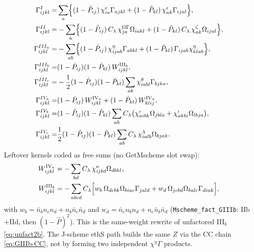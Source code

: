 \documentclass[enabledeprecatedfontcommands]{scrartcl}
\newcommand{\codename}[1]{\texttt{#1}}
\newcommand{\MyRomanNum}[1]{%
  \ifcase#1\or I\or II\or III\or IV\or V\or VI\or VII\or VIII\or IX\or X\else #1\fi}
\begin{document}
\begin{subequations}\label{eq:fact2b}
\begin{align}
\Gamma^{\MyRomanNum{1}}_{ijkl}
  =&\sum_{a}\Bigl\{
    (1-\hat P_{ij})\,\chi^{\epsilon}_{ia}\Gamma_{ajkl}
   +(1-\hat P_{kl})\,\chi^{\epsilon}_{ak}\Gamma_{ijal}
  \Bigr\},\\
\Gamma^{\MyRomanNum{2}}_{ijkl}
  =&-\sum_{a}\Bigl\{
    (1-\hat P_{ij})\,C_\lambda\,\chi^{\Omega\Gamma}_{ja}\Omega_{iakl}
   +(1-\hat P_{kl})\,C_\lambda\,\chi^{\zeta}_{ak}\Omega_{ijal}
  \Bigr\},
  \label{eq:GII}\\
\Gamma^{\MyRomanNum{3}_a}_{ijkl}
  =&-\sum_{ab}\Bigl\{
    (1-\hat P_{ij})\,\chi^{\eta}_{ijab}\Gamma_{abkl}
   +(1-\hat P_{kl})\,\Gamma_{ijab}\chi^{\eta}_{klab}
  \Bigr\},
  \label{eq:GIIIa}\\
\Gamma^{\MyRomanNum{3}_b}_{ijkl}
  =&(1-\hat P_{ij})(1-\hat P_{kl})\,W^{\mathrm{III}_b}_{ijkl},
  \label{eq:GIIIb}\\
\Gamma^{\MyRomanNum{3}_c}_{ijkl}
  =&-\frac12(1-\hat P_{ij})(1-\hat P_{kl})
    \sum_{ab}\chi^{\theta}_{iabl}\Gamma_{bjka},\\
\Gamma^{\MyRomanNum{4}_a}_{ijkl}
  =&(1-\hat P_{ij})\,W^{\mathrm{IV}_a}_{ijkl}
    +(1-\hat P_{kl})\,W^{\mathrm{IV}_a}_{klij},
  \label{eq:GIVa}\\
\Gamma^{\MyRomanNum{4}_b}_{ijkl}
  =&(1-\hat P_{ij})(1-\hat P_{kl})
    \sum_{ab}C_\lambda
    \bigl(
      \chi^{\iota}_{aibk}\Omega_{jbla}
     +\chi^{\iota}_{akbi}\Omega_{lbja}
    \bigr),
  \label{eq:GIVb}\\
\Gamma^{\MyRomanNum{4}_c}_{ijkl}
  =&\frac12(1-\hat P_{ij})(1-\hat P_{kl})
    \sum_{ab}C_\lambda\,\chi^{\lambda}_{ialb}\Omega_{bjak}.
\end{align}
\end{subequations}
Leftover kernels coded as free sums (no GetMscheme slot swap):
\begin{align}
  W^{\mathrm{IV}_a}_{ijkl}
  &=-\sum_{bd}C_\lambda\,\chi^{\kappa}_{ijbd}\Omega_{dbkl},
  \label{eq:WIVa}\\
  W^{\mathrm{III}_b}_{ijkl}
  &=-\sum_{abcd}C_\lambda\Bigl[
    w_b\,\Omega_{dcbk}\Omega_{biac}\Gamma_{jald}
   +w_d\,\Omega_{jcbd}\Omega_{balc}\Gamma_{diak}
  \Bigr],
  \label{eq:WIIb}
\end{align}
with $w_b=\bar n_b n_c n_d+n_b\bar n_c\bar n_d$ and
$w_d=\bar n_c n_b n_d+n_c\bar n_b\bar n_d$
(\codename{Mscheme\_fact\_GIIIb}: IIb$+$IId, then $(1-\hat P)^2$).
This is the same-weight rewrite of unfactored III$_b$ \eqref{eq:unfact2b}.
The J-scheme ethS path builds the same $Z$ via the CC chain
\eqref{eq:GIIIb-CC}, not by forming two independent $\chi^\eta\Gamma$
products.
\end{document}
